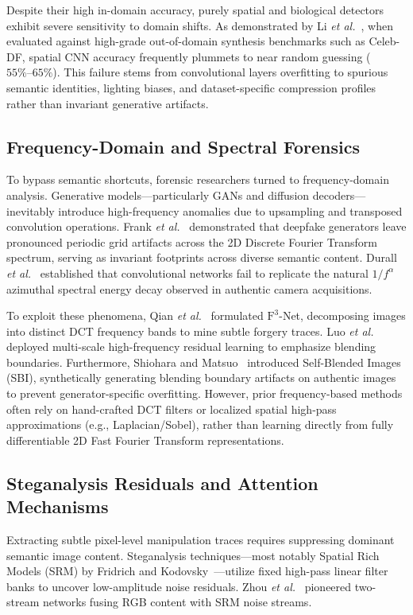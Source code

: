 \documentclass[journal,10pt,twocolumn]{article}
\begin{document}
Despite their high in-domain accuracy, purely spatial and biological detectors exhibit severe sensitivity to domain shifts. As demonstrated by Li \textit{et al.}~\cite{li2020celebdf}, when evaluated against high-grade out-of-domain synthesis benchmarks such as Celeb-DF, spatial CNN accuracy frequently plummets to near random guessing ($55\%\text{--}65\%$). This failure stems from convolutional layers overfitting to spurious semantic identities, lighting biases, and dataset-specific compression profiles rather than invariant generative artifacts.

\subsection{Frequency-Domain and Spectral Forensics}
To bypass semantic shortcuts, forensic researchers turned to frequency-domain analysis. Generative models---particularly GANs and diffusion decoders---inevitably introduce high-frequency anomalies due to upsampling and transposed convolution operations. Frank \textit{et al.}~\cite{frank2020frequency} demonstrated that deepfake generators leave pronounced periodic grid artifacts across the 2D Discrete Fourier Transform spectrum, serving as invariant footprints across diverse semantic content. Durall \textit{et al.}~\cite{durall2020watch} established that convolutional networks fail to replicate the natural $1/f^\alpha$ azimuthal spectral energy decay observed in authentic camera acquisitions.

To exploit these phenomena, Qian \textit{et al.}~\cite{qian2020f3net} formulated $\text{F}^3$-Net, decomposing images into distinct DCT frequency bands to mine subtle forgery traces. Luo \textit{et al.}~\cite{luo2021highfreq} deployed multi-scale high-frequency residual learning to emphasize blending boundaries. Furthermore, Shiohara and Matsuo~\cite{shiohara2022sbi} introduced Self-Blended Images (SBI), synthetically generating blending boundary artifacts on authentic images to prevent generator-specific overfitting. However, prior frequency-based methods often rely on hand-crafted DCT filters or localized spatial high-pass approximations (e.g., Laplacian/Sobel), rather than learning directly from fully differentiable 2D Fast Fourier Transform representations.

\subsection{Steganalysis Residuals and Attention Mechanisms}
Extracting subtle pixel-level manipulation traces requires suppressing dominant semantic image content. Steganalysis techniques---most notably Spatial Rich Models (SRM) by Fridrich and Kodovsky~\cite{fridrich2012rich}---utilize fixed high-pass linear filter banks to uncover low-amplitude noise residuals. Zhou \textit{et al.}~\cite{zhou2018two} pioneered two-stream networks fusing RGB content with SRM noise streams. 
\end{document}
